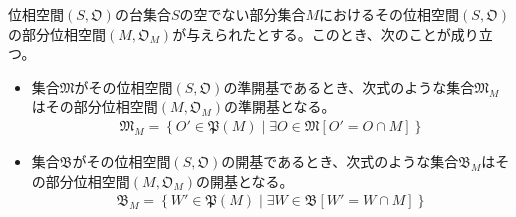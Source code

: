 \documentclass[dvipdfmx]{jsarticle}
\begin{document}
\begin{thm}\label{8.1.4.10}
位相空間$\left( S,\mathfrak{O} \right)$の台集合$S$の空でない部分集合$M$におけるその位相空間$\left( S,\mathfrak{O} \right)$の部分位相空間$\left( M,\mathfrak{O}_{M} \right)$が与えられたとする。このとき、次のことが成り立つ。
\begin{itemize}
\item
  集合$\mathfrak{M}$がその位相空間$\left( S,\mathfrak{O} \right)$の準開基であるとき、次式のような集合$\mathfrak{M}_{M}$はその部分位相空間$\left( M,\mathfrak{O}_{M} \right)$の準開基となる。
\begin{align*}
\mathfrak{M}_{M} = \left\{ O'\in \mathfrak{P}(M) \middle| \exists O \in \mathfrak{M}\left[ O' = O \cap M \right] \right\}
\end{align*}
\item
  集合$\mathfrak{B}$がその位相空間$\left( S,\mathfrak{O} \right)$の開基であるとき、次式のような集合$\mathfrak{B}_{M}$はその部分位相空間$\left( M,\mathfrak{O}_{M} \right)$の開基となる。
\begin{align*}
\mathfrak{B}_{M} = \left\{ W'\in \mathfrak{P}(M) \middle| \exists W \in \mathfrak{B}\left[ W' = W \cap M \right] \right\}
\end{align*}
\end{itemize}
\end{thm}
\end{document}
